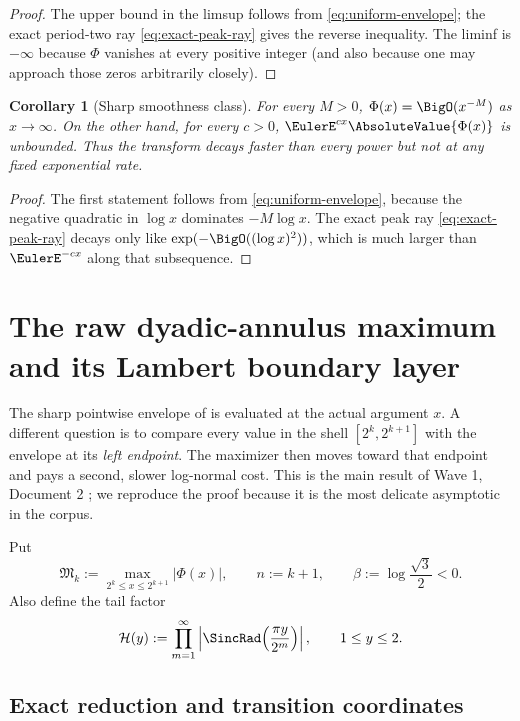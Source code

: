 \documentclass[11pt,oneside]{article}
\newtheorem{corollary}[corollary]{Corollary}
\theoremstyle{definition}
\theoremstyle{remark}
\newcommand{\Phiup}{\Phi}
\begin{document}
\begin{proof}
The upper bound in the limsup follows from \eqref{eq:uniform-envelope}; the exact period-two
ray \eqref{eq:exact-peak-ray} gives the reverse inequality.  The liminf is $-\infty$ because
$\Phiup$ vanishes at every positive integer (and also because one may approach those zeros
arbitrarily closely).
\end{proof}

\begin{corollary}[Sharp smoothness class]
\label{cor:superpoly-subexp}
For every $M>0$, $\Phiup(x)=\BigO(x^{-M})$ as $x\to\infty$.  On the other hand, for every
$c>0$, $\EulerE^{cx}\AbsoluteValue{\Phiup(x)}$ is unbounded.  Thus the transform decays faster than every
power but not at any fixed exponential rate.
\end{corollary}

\begin{proof}
The first statement follows from \eqref{eq:uniform-envelope}, because the negative
quadratic in $\log x$ dominates $-M\log x$.  The exact peak ray
\eqref{eq:exact-peak-ray} decays only like $\exp(-\BigO((\log x)^2))$, which is much larger
than $\EulerE^{-cx}$ along that subsequence.
\end{proof}


\section{The raw dyadic-annulus maximum and its Lambert boundary layer}
\label{sec:annular-maxima}

The sharp pointwise envelope of  is evaluated at the actual
argument $x$.  A different question is to compare every value in the shell
$[2^k,2^{k+1}]$ with the envelope at its \emph{left endpoint}.  The maximizer then moves
toward that endpoint and pays a second, slower log-normal cost.  This is the main result of
Wave 1, Document 2 \cite{wave1-doc2}; we reproduce the proof because it is the most delicate
asymptotic in the corpus.

Put
\begin{equation}
 \mathfrak M_k:=\max_{2^k\le x\le2^{k+1}}|\Phiup(x)|,
 \qquad n:=k+1,
 \qquad \beta:=\log\frac{\sqrt3}{2}<0.
 \label{eq:annular-M}
\end{equation}
Also define the tail factor
\[
 \mathcal H(y):=\prod_{m=1}^{\infty}\left|\SincRad\!\left(\frac{\pi y}{2^m}\right)\right|,
 \qquad 1\le y\le2.
\]

\subsection{Exact reduction and transition coordinates}
\end{document}
